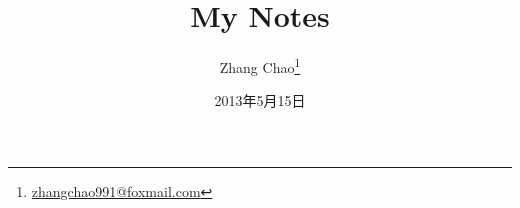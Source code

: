 \title{\vspace{-10mm}\Huge \textbf{My Notes} \vspace{100mm}}
\author{Zhang Chao\footnote{\href{mailto:zhangchao991@foxmail.com}{zhangchao991@foxmail.com}}}
\date{2013年5月15日}
\maketitle
